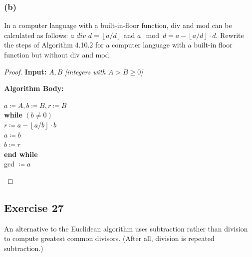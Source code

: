 \documentclass[14pt]{extarticle}
\newcommand{\cy}{\color{cyan}}
\newcommand{\floor}[1]{{\left\lfloor#1\right\rfloor}}
\begin{document}
\subsubsection{(b)}
In a computer language with a built-in-floor function, div and mod can be calculated as follows: $a$ $div$ $d = \floor{a/d}$ and $a \mod d = a - \floor{a/d} \cdot d$. Rewrite the steps of Algorithm 4.10.2 for a computer language with a built-in floor function but without div and mod.

\begin{proof}
{\bf \cy Input:} $A, B$ {\it [integers with $A > B \geq 0$]}

{\bf \cy Algorithm Body:}
\begin{tabbing}
$a \coloneqq A, b \coloneqq B, r \coloneqq B$ \\
{\bf whi}\={\bf le} $(b \neq 0)$ \\
         \>$r \coloneqq a - \floor{a/b}\cdot b$ \\
         \>$a \coloneqq b$ \\
         \>$b \coloneqq r$ \\
{\bf end while} \\
gcd $\coloneqq a$
\end{tabbing}
\end{proof}

\subsection{Exercise 27}
An alternative to the Euclidean algorithm uses subtraction rather than division to compute greatest common divisors. (After all, division is repeated subtraction.) 
\end{document}
